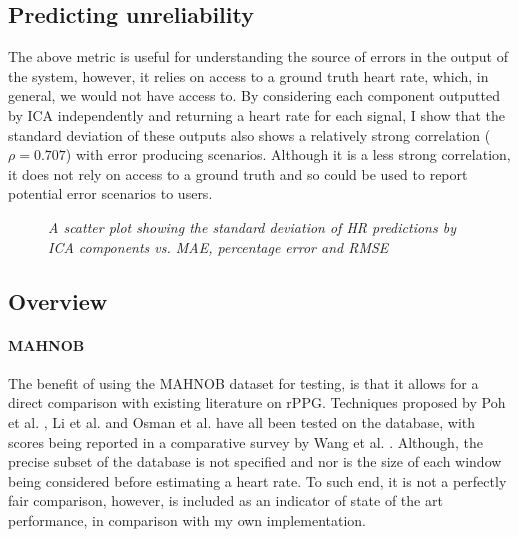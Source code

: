 \subsection{Predicting unreliability}
The above metric is useful for understanding the source of errors in the output of the system, however, it relies on access to a ground truth heart rate, which, in general, we would not have access to.
By considering each component outputted by ICA independently and returning a heart rate for each signal, I show that the standard deviation of these outputs also shows a relatively strong correlation ($\rho=0.707$) with error producing scenarios.
Although it is a less strong correlation, it does not rely on access to a ground truth and so could be used to report potential error scenarios to users.
\begin{figure}[H]
    \centering
    \subfloat{\scalebox{0.6}{}}
    \subfloat{\scalebox{0.6}{}}
    \subfloat{\scalebox{0.6}{}}
    \caption{\textit{A scatter plot showing the standard deviation of HR predictions by ICA components vs. MAE, percentage error and RMSE}}
\end{figure}

\subsection{Overview}
\label{eval:overall}


\paragraph{MAHNOB}
The benefit of using the MAHNOB dataset for testing, is that it allows for a direct comparison with existing literature on rPPG.
Techniques proposed by Poh et al. \cite{poh}, Li et al. \cite{li} and Osman et al. \cite{osman} have all been tested on the database, with 
scores being reported in a comparative survey by Wang et al. \cite{comparative}.
Although, the precise subset of the database is not specified and nor is the size of each window being considered before estimating a heart rate.
To such end, it is not a perfectly fair comparison, however, is included as an indicator of state of the art performance, in comparison with my own implementation.

